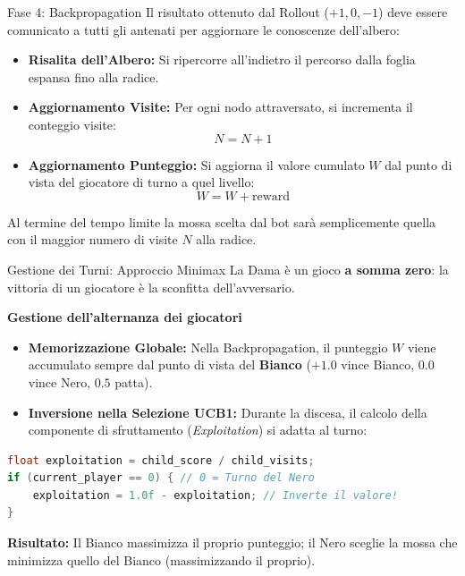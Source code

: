 \documentclass[10pt]{beamer}
\begin{document}
\begin{frame}{Fase 4: Backpropagation}
    Il risultato ottenuto dal Rollout ($+1, 0, -1$) deve essere comunicato a tutti gli antenati per aggiornare le conoscenze dell'albero:
    
    \vspace{0.3cm}
    \begin{itemize}
        \item \textbf{Risalita dell'Albero:} Si ripercorre all'indietro il percorso dalla foglia espansa fino alla radice.
        \item \textbf{Aggiornamento Visite:} Per ogni nodo attraversato, si incrementa il conteggio visite:
        $$N = N + 1$$
        \item \textbf{Aggiornamento Punteggio:} Si aggiorna il valore cumulato $W$ dal punto di vista del giocatore di turno a quel livello:
        $$W = W + \text{reward}$$
    \end{itemize}
    \vspace{0.2cm}
    Al termine del tempo limite la mossa scelta dal bot sarà semplicemente quella con il maggior numero di visite $N$ alla radice.
\end{frame}

\begin{frame}[fragile]{Gestione dei Turni: Approccio Minimax}
    La Dama è un gioco \textbf{a somma zero}: la vittoria di un giocatore è la sconfitta dell'avversario.
    
    \vspace{0.2cm}
    \textbf{Gestione dell'alternanza dei giocatori}
    \begin{itemize}
        \item \textbf{Memorizzazione Globale:} Nella Backpropagation, il punteggio $W$ viene accumulato sempre dal punto di vista del \textbf{Bianco} ($+1.0$ vince Bianco, $0.0$ vince Nero, $0.5$ patta).
        \item \textbf{Inversione nella Selezione UCB1:} Durante la discesa, il calcolo della componente di sfruttamento (\textit{Exploitation}) si adatta al turno:
    \end{itemize}

\begin{lstlisting}[language=C, basicstyle=\ttfamily\footnotesize, keywordstyle=\color{blue}]
float exploitation = child_score / child_visits;
if (current_player == 0) { // 0 = Turno del Nero
    exploitation = 1.0f - exploitation; // Inverte il valore!
}
\end{lstlisting}

    \vspace{0.1cm}
    \textbf{Risultato:} Il Bianco massimizza il proprio punteggio; il Nero sceglie la mossa che minimizza quello del Bianco (massimizzando il proprio).
\end{frame}
\end{document}
